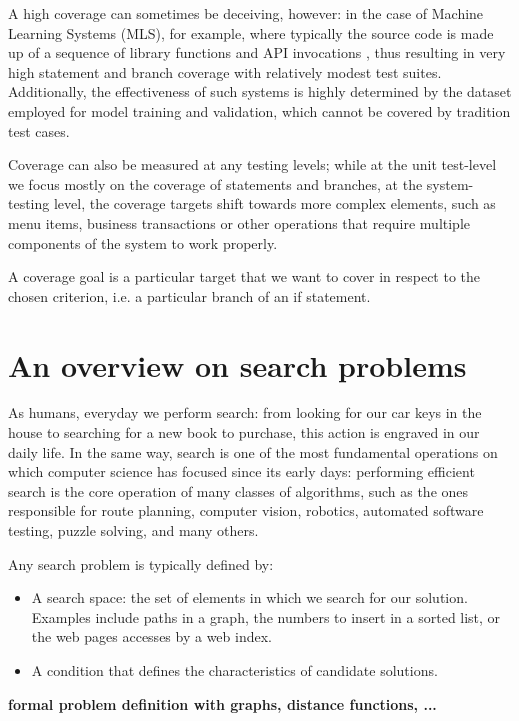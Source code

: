 A high coverage can sometimes be deceiving, however: in the case of Machine Learning Systems (MLS), for example, where typically the source code is made up of a sequence of library functions and API invocations \cite{DBLP:journals/ese/RiccioJSHWT20}, thus resulting in very high statement and branch coverage with relatively modest
test suites. Additionally, the effectiveness of such systems is highly determined by the dataset employed for model training and validation, which cannot be covered by tradition test cases.

Coverage can also be measured at any testing levels; while at the unit test-level we focus mostly on the coverage of statements and branches, at the system-testing level, the coverage targets shift towards more complex elements, such as menu items, business transactions or other operations that require multiple components of the system to work properly.

A coverage goal is a particular target that we want to cover in respect to the chosen criterion, i.e. a particular branch of an if statement.





\newpage
\section{An overview on search problems}
As humans, everyday we perform search: from looking for our car keys in the house to searching for a new book to purchase, this action is engraved in our daily life.
In the same way, search is one of the most fundamental operations on which computer science has focused since its early days: performing efficient search is the core operation of many classes of algorithms, such as the ones responsible for route planning, computer vision, robotics, automated software testing, puzzle solving, and many others.


Any search problem is typically defined by: 
\begin{itemize}
    \item A search space: the set of elements in which we search for our solution. Examples include paths in a graph, the numbers to insert in a sorted list, or the web pages accesses by a web index.
    \item A condition that defines the characteristics of candidate solutions.
\end{itemize}

\textbf{formal problem definition with graphs, distance functions, ...}

